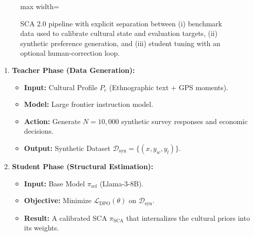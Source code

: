 \begin{figure}[htbp]
\begin{adjustbox}{max width=\textwidth}
    \end{adjustbox}
    \caption{SCA 2.0 pipeline with explicit separation between (i) benchmark data used to calibrate cultural state and evaluation targets, (ii) synthetic preference generation, and (iii) student tuning with an optional human-correction loop.}
    \label{fig:sca2-pipeline-extended}
\end{figure}

\begin{enumerate}
    \item \textbf{Teacher Phase (Data Generation):}
    \begin{itemize}
        \item \textbf{Input:} Cultural Profile $P_c$ (Ethnographic text + GPS moments).
        \item \textbf{Model:} Large frontier instruction model.
        \item \textbf{Action:} Generate $N=10,000$ synthetic survey responses and economic decisions.
        \item \textbf{Output:} Synthetic Dataset $\mathcal{D}_{\text{syn}} = \{(x, y_w, y_l)\}$.
    \end{itemize}
    
    \item \textbf{Student Phase (Structural Estimation):}
    \begin{itemize}
        \item \textbf{Input:} Base Model $\pi_{\text{ref}}$ (Llama-3-8B).
        \item \textbf{Objective:} Minimize $\mathcal{L}_{\text{DPO}}(\theta)$ on $\mathcal{D}_{\text{syn}}$.
        \item \textbf{Result:} A calibrated SCA $\pi_{\text{SCA}}$ that internalizes the cultural priors into its weights.
    \end{itemize}
\end{enumerate}

